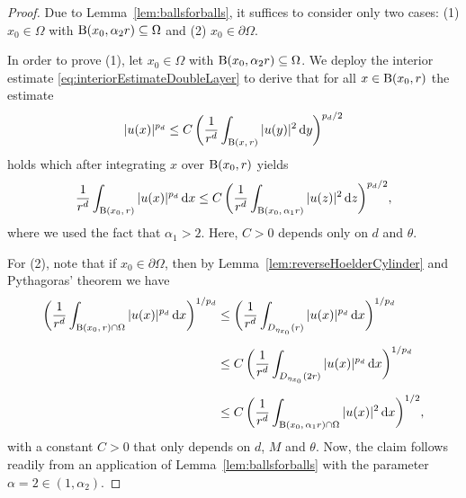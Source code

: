 \begin{proof}

  Due to Lemma~\ref{lem:ballsforballs}, it suffices to consider only two cases: (1) $x_0 \in \Omega$ with $\mathrm{B}(x_0,\alpha_2 r) \subseteq \Omega$ and (2) $x_0 \in \partial\Omega$.

  In order to prove (1), let $x_0 \in \Omega$ with $\mathrm{B}(x_0,\alpha_2 r) \subseteq \Omega$. We deploy the interior estimate \eqref{eq:interiorEstimateDoubleLayer} to derive that for all $x \in \mathrm{B}(x_0,r)$ the estimate
  \begin{align*}
    |u(x)|^{p_d} \leq C\, \bigg( \frac{1}{r^{d}} \int_{\mathrm{B}(x,\,r)} |u(y)|^2 \, {\operatorname{d}\!{y}} \bigg)^{{p_d}/2}
  \end{align*}
  holds which after integrating $x$ over $\mathrm{B}(x_0, r)$ yields
  \begin{align*}
    \frac{1}{r^{d}}\int_{\mathrm{B}(x_0,\, r)} |u(x)|^{p_d} \, {\operatorname{d}\!{x}} \leq C\, \bigg(  \frac{1}{r^{d}}\int_{\mathrm{B}(x_0,\, \alpha_1 r)} |u(z)|^2 \, {\operatorname{d}\!{z}} \bigg)^{{p_d}/2},
  \end{align*}
  where we used the fact that $\alpha_1 > 2$. 
  Here, $C > 0$ depends only on $d$ and $\theta$.

  For (2), note that if $x_0 \in \partial\Omega$, then by Lemma~\ref{lem:reverseHoelderCylinder} and Pythagoras' theorem we have
  \begin{align*}
    \bigg( \frac{1}{r^d} \int_{\mathrm{B}(x_0,\, r) \cap \Omega} |u(x)|^{p_d} \, {\operatorname{d}\!{x}} \bigg)^{1/{p_d}}
    &\leq \bigg( \frac{1}{r^d} \int_{D_{\eta_{x_0}}(r)} |u(x)|^{p_d} \, {\operatorname{d}\!{x}} \bigg)^{1/{p_d}} \\[0.5em]
    &\leq C \, \bigg( \frac{1}{r^d} \int_{D_{\eta_{x_0}}(2 r)} |u(x)|^{p_d} \, {\operatorname{d}\!{x}} \bigg)^{1/{p_d}} \\[0.5em]
    &\leq C \, \bigg( \frac{1}{r^d} \int_{\mathrm{B}(x_0,\, \alpha_1 r) \cap \Omega} |u(x)|^2 \, {\operatorname{d}\!{x}} \bigg)^{1/2},
  \end{align*}
  with a constant $C > 0$ that only depends on $d$, $M$ and $\theta$.
  Now, the claim follows readily from an application of Lemma~\ref{lem:ballsforballs} with the parameter $\alpha = 2 \in (1, \alpha_2)$.
\end{proof}

